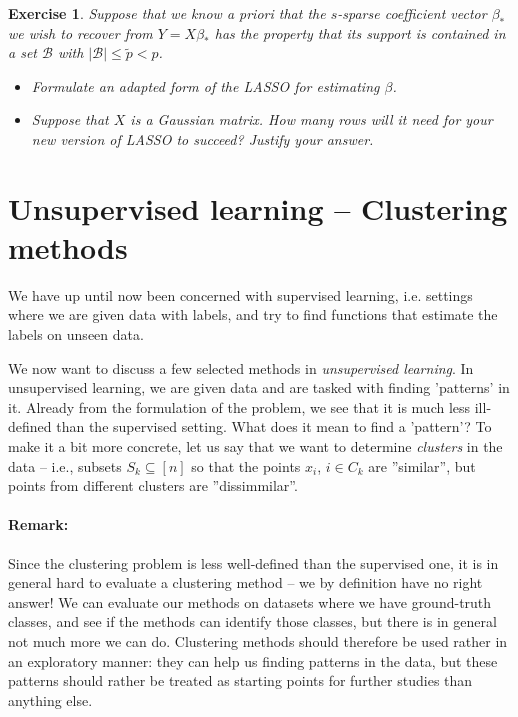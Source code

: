 \documentclass{article}
\newcommand{\sse}{\subseteq}
\newtheorem{exercise}{Exercise}
\newcommand{\abs}[1]{\vert #1 \vert}
\begin{document}
\begin{exercise}
    Suppose that we know a priori that the $s$-sparse coefficient vector $\beta_*$ we wish to recover from $Y=X\beta_*$ has the property that its support is contained in a set $\mathcal{B}$ with $\abs{\mathcal{B}}\leq \tilde{p}<p$.
    \begin{itemize}
        \item Formulate an adapted form of the LASSO for estimating $\beta$.
        \item Suppose that $X$ is a Gaussian matrix. How many rows will it need for your new version of LASSO to succeed? Justify your answer.
    \end{itemize}
\end{exercise}



\section{Unsupervised learning -- Clustering methods}  
We have up until now been concerned with supervised learning, i.e. settings where we are given data with labels, and try to find functions that estimate the labels on unseen data.

We now want to discuss a few selected methods in \emph{unsupervised learning}. In unsupervised learning, we are given data and are tasked with finding 'patterns' in it. Already from the formulation of the problem, we see that it is much less ill-defined than the supervised setting. What does it mean to find a 'pattern'? To make it a bit more concrete, let us say that we want to determine \emph{clusters} in the data -- i.e., subsets $S_k\sse [n]$ so that the points $x_i$, $i\in C_k$ are ''similar'', but points from different clusters are ''dissimmilar''.

\paragraph{Remark:} Since the clustering problem is less well-defined than the supervised one, it is in general hard to evaluate a clustering method -- we by definition have no right answer! We can evaluate our methods on datasets where we have ground-truth classes, and see if the methods can identify those classes, but there is in general not much more we can do. Clustering methods should therefore be used rather in an exploratory manner: they can help us finding patterns in the data, but these patterns should rather be treated as starting points for further studies than anything else. \newline
\end{document}
